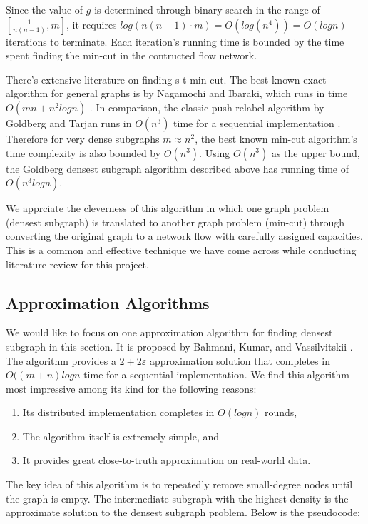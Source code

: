 \documentclass{article}
\begin{document}
Since the value of $g$ is determined through binary search in the range of $[\frac{1}{n(n-1)}, m]$, it requires $log(n(n-1) \cdot m) = O(log(n^4)) = O(logn)$ iterations to terminate. Each iteration's running time is bounded by the time spent finding the min-cut in the contructed flow network.

There's extensive literature on finding s-t min-cut. The best known exact algorithm for general graphs is by Nagamochi and Ibaraki, which runs in time $O(mn + n^2logn)$ \cite{Nagamochi:1992:CEM:131829.131833}. In comparison, the classic push-relabel algorithm by Goldberg and Tarjan runs in $O(n^3)$ time for a sequential implementation \cite{Goldberg:1988:NAM:48014.61051}. Therefore for very dense subgraphs $m \approx n^2$, the best known min-cut algorithm's time complexity is also bounded by $O(n^3)$. Using $O(n^3)$ as the upper bound, the Goldberg densest subgraph algorithm described above has running time of $O(n^3logn)$.

We apprciate the cleverness of this algorithm in which one graph problem (densest subgraph) is translated to another graph problem (min-cut) through converting the original graph to a network flow with carefully assigned capacities. This is a common and effective technique we have come across while conducting literature review for this project.

\subsection{Approximation Algorithms}
We would like to focus on one approximation algorithm for finding densest subgraph in this section. It is proposed by Bahmani, Kumar, and Vassilvitskii \cite{Bahmani:2012:DSS:2140436.2140442}. The algorithm provides a $2 + 2\varepsilon$ approximation solution that completes in $O((m+n)logn$ time for a sequential implementation. We find this algorithm most impressive among its kind for the following reasons:

\begin{enumerate}
  \item Its distributed implementation completes in $O(logn)$ rounds,
  \item The algorithm itself is extremely simple, and
  \item It provides great close-to-truth approximation on real-world data.
\end{enumerate}

The key idea of this algorithm is to repeatedly remove small-degree nodes until the graph is empty. The intermediate subgraph with the highest density is the approximate solution to the densest subgraph problem. Below is the pseudocode:
\end{document}
